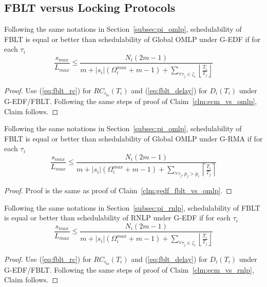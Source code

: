 \subsection{FBLT versus Locking Protocols}\label{subsec:fblt_vs_locking_comp}
%
\begin{clm}\label{clm:gedf_fblt_vs_omlp}
%
Following the same notations in Section~\ref{subsec:pi_omlp}, schedulability of FBLT is equal or better than schedulability of Global OMLP under G-EDF if for each $\tau_i$
%
\begin{equation*}
\frac{s_{max}}{L_{max}}\le\frac{N_{i}\left(2m-1\right)}{m+|s_{i}|\left(\Omega_{i}^{max}+m-1\right)+\sum_{\forall\tau_{j}\in\zeta_{i}}\left\lfloor \frac{T_{i}}{T_{j}}\right\rfloor }
\end{equation*}
%
\end{clm}
%
\begin{proof}
%
Use (\ref{eq:fblt_rc}) for $RC_{i_{to}}(T_i)$ and (\ref{eq:fblt_delay}) for $D_i(T_i)$ under G-EDF/FBLT. Following the same steps of proof of Claim~\ref{clm:ecm_vs_omlp}, Claim follows.
%
\end{proof}
%
\begin{clm}\label{clm:grma_fblt_vs_omlp}
%
Following the same notations in Section~\ref{subsec:pi_omlp}, schedulability of FBLT is equal or better than schedulability of Global OMLP under G-RMA if for each $\tau_i$
%
\begin{equation*}
\frac{s_{max}}{L_{max}}\le\frac{N_{i}\left(2m-1\right)}{m+|s_{i}|\left(\Omega_{i}^{max}+m-1\right)+\sum_{\forall\tau_{j},p_{j}>p_{i}}\left\lceil \frac{T_{i}}{T_{j}}\right\rceil }
\end{equation*}
%
\end{clm}
%
\begin{proof}
%
Proof is the same as proof of Claim~\ref{clm:gedf_fblt_vs_omlp}.
%
\end{proof}
%
\begin{clm}\label{clm:gedf_fblt_vs_rnlp}
%
Following the same notations in Section~\ref{subsec:pi_rnlp}, schedulability of FBLT is equal or better than schedulability of RNLP under G-EDF if for each $\tau_i$
%
\begin{equation*}
\frac{s_{max}}{L_{max}}\le\frac{N_{i}\left(2m-1\right)}{m+|s_{i}|\left(\Omega_{i}^{max}+m-1\right)+\sum_{\forall\tau_{j}\in\zeta_{i}}\left\lfloor \frac{T_{i}}{T_{j}}\right\rfloor }
\end{equation*}
%
\end{clm}
%
\begin{proof}
%
Use (\ref{eq:fblt_rc}) for $RC_{i_{to}}(T_i)$ and (\ref{eq:fblt_delay}) for $D_i(T_i)$ under G-EDF/FBLT. Following the same steps of proof of Claim~\ref{clm:ecm_vs_rnlp}, Claim follows.
%
\end{proof}
